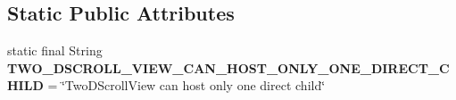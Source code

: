 \subsection*{Static Public Attributes}
\begin{DoxyCompactItemize}
\item 
\mbox{\label{classcom_1_1example_1_1victorardianto_1_1myapplication_1_1widget_1_1_two_d_scroll_view_a4bc1d48ec01e47dad6f42322664302a5}} 
static final String {\bfseries T\+W\+O\+\_\+\+D\+S\+C\+R\+O\+L\+L\+\_\+\+V\+I\+E\+W\+\_\+\+C\+A\+N\+\_\+\+H\+O\+S\+T\+\_\+\+O\+N\+L\+Y\+\_\+\+O\+N\+E\+\_\+\+D\+I\+R\+E\+C\+T\+\_\+\+C\+H\+I\+LD} = \char`\"{}Two\+D\+Scroll\+View can host only one direct child\char`\"{}
\end{DoxyCompactItemize}
